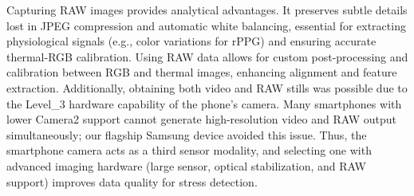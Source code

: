 Capturing RAW images provides analytical advantages. It preserves subtle details lost in JPEG compression and automatic white balancing, essential for extracting physiological signals (e.g., color variations for rPPG) and ensuring accurate thermal-RGB calibration. Using RAW data allows for custom post-processing and calibration between RGB and thermal images, enhancing alignment and feature extraction. Additionally, obtaining both video and RAW stills was possible due to the Level\_3 hardware capability of the phone's camera. Many smartphones with lower Camera2 support cannot generate high-resolution video and RAW output simultaneously; our flagship Samsung device avoided this issue. Thus, the smartphone camera acts as a third sensor modality, and selecting one with advanced imaging hardware (large sensor, optical stabilization, and RAW support) improves data quality for stress detection.

